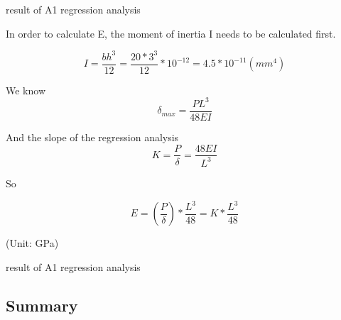 \begin{minipage}[t]{\textwidth}
    \makeatletter{}
    \centering
    \caption{result of A1 regression analysis}
    \label{t1} 
\end{minipage}

In order to calculate E, the moment of inertia I needs to be calculated first.

\begin{equation} 
I=\frac{bh^3}{12}=\frac{20*3^3}{12}*10^{-12}=4.5*10^{-11} (mm^4)
\end{equation}

We know 
\begin{equation} 
    \delta_{max}=\frac{PL^3}{48EI}
\end{equation}

And the slope of the regression analysis
\begin{equation} 
    K=\frac{P}{\delta}=\frac{48EI}{L^3}
\end{equation}

So

\begin{equation} 
    E=(\frac{P}{\delta})*\frac{L^3}{48}=K*\frac{L^3}{48}
\end{equation}

\begin{minipage}[t]{\textwidth}
    \makeatletter{}
    \centering
    
    (Unit: GPa)
    \caption{result of A1 regression analysis}
    \label{table4} 
\end{minipage}


\subsection*{Summary}



